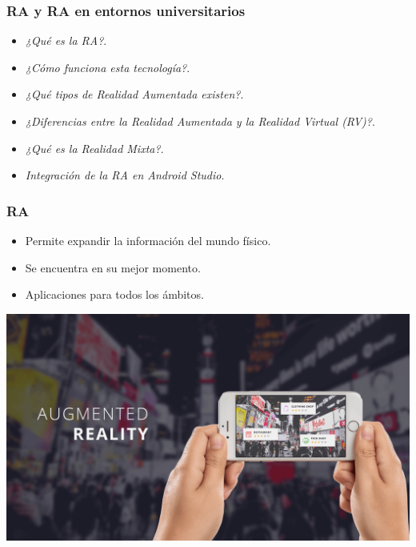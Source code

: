 \begin{frame}
	\frametitle{RA y RA en entornos universitarios}
		\begin{itemize}
			\item {\it ¿Qué es la RA?}.
			\item {\it ¿Cómo funciona esta tecnología?}.
			\item {\it ¿Qué tipos de Realidad Aumentada existen?}.
			\item {\it ¿Diferencias entre la Realidad Aumentada y la Realidad Virtual (RV)?}.
			\item {\it ¿Qué es la Realidad Mixta?}.
			\item {\it Integración de la RA en Android Studio}.
		\end{itemize}
	\endblock{}
\end{frame}


\begin{frame}
	\frametitle{RA}
		\begin{itemize}
			\item Permite expandir la información del mundo físico.
			\item Se encuentra en su mejor momento.
			\item Aplicaciones para todos los ámbitos. 
		\end{itemize}
		\endblock{}

		\begin{center}
			\includegraphics[width=0.7\linewidth]{Images/ar3}
		\end{center}
	
\end{frame}

